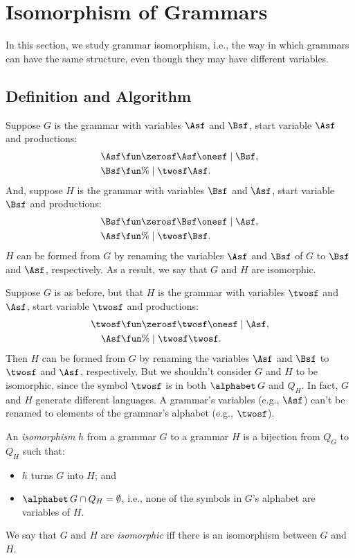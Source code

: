 \section{Isomorphism of Grammars}
\label{IsomorphismOfGrammars}

In this section, we study grammar isomorphism, i.e., the way in
which grammars can have the same structure, even though they may have
different variables.

\subsection{Definition and Algorithm}

Suppose $G$ is the grammar with variables $\Asf$ and $\Bsf$,
start variable $\Asf$ and productions:
\begin{align*}
  \Asf &\fun \zerosf\Asf\onesf \mid \Bsf , \\
  \Bsf &\fun \% \mid \twosf\Asf .
\end{align*}
And, suppose $H$ is the grammar with variables $\Bsf$ and $\Asf$,
start variable $\Bsf$ and productions:
\begin{align*}
  \Bsf &\fun \zerosf\Bsf\onesf \mid \Asf , \\
  \Asf &\fun \% \mid \twosf\Bsf .
\end{align*}
$H$ can be formed from $G$ by renaming the variables $\Asf$ and $\Bsf$
of $G$ to $\Bsf$ and $\Asf$, respectively.  As a result, we say that
$G$ and $H$ are isomorphic.

Suppose $G$ is as before, but that $H$ is the grammar with variables
$\twosf$ and $\Asf$, start variable $\twosf$ and productions:
\begin{align*}
  \twosf &\fun \zerosf\twosf\onesf \mid \Asf , \\
  \Asf &\fun \% \mid \twosf\twosf .
\end{align*}
Then $H$ can be formed from $G$ by renaming the variables $\Asf$ and
$\Bsf$ to $\twosf$ and $\Asf$, respectively.  But we shouldn't
consider $G$ and $H$ to be isomorphic, since the symbol $\twosf$ is in
both $\alphabet\,G$ and $Q_H$.  In fact, $G$ and $H$ generate
different languages.  A grammar's variables (e.g., $\Asf$) can't be
renamed to elements of the grammar's alphabet (e.g., $\twosf$).

An \emph{isomorphism} $h$ from a grammar $G$ to a grammar $H$ is
a bijection from $Q_G$ to $Q_H$ such that:
\begin{itemize}
\item $h$ turns $G$ into $H$; and

\item $\alphabet\,G\cap Q_H=\emptyset$, i.e., none of the symbols in
  $G$'s alphabet are variables of $H$.
\end{itemize}
We say that $G$ and $H$ are \emph{isomorphic} iff there is an
isomorphism between $G$ and $H$.

